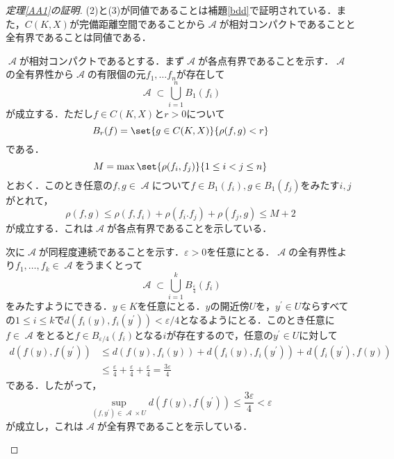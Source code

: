 \documentclass[uplatex]{jsarticle}
\begin{document}
\begin{proof}[定理\ref{AA1}の証明]
    (2)と(3)が同値であることは補題\ref{bdd}で証明されている．また，$C(K,X)$が完備距離空間であることから$\mscrA$が相対コンパクトであることと全有界であることは同値である．

    \begin{subproof}{}
        $\mscrA$が相対コンパクトであるとする．まず$\mscrA$が各点有界であることを示す．$\mscrA$の全有界性から$\mscrA$の有限個の元$f_1,\dots f_n$が存在して
        \[ \mscrA \subset \bigcup_{i=1}^n B_1(f_i) \]
        が成立する．ただし$f\in C(K,X)$と$r > 0$について
        \[ B_r(f) = \set{g\in C(K,X)}{\rho(f,g) < r} \]
        である．
        \[ M = \max \set{\rho(f_i,f_j)}{1\leq i < j \leq n} \]
        とおく．このとき任意の$f,g\in \mscrA$について$f\in B_1(f_i),g\in B_1(f_j)$をみたす$i,j$がとれて，
        \[ \rho(f,g) \leq \rho(f,f_i) + \rho(f_i.f_j) + \rho(f_j,g) \leq M+2 \]
        が成立する．これは$\mscrA$が各点有界であることを示している．

        次に$\mscrA$が同程度連続であることを示す．$\varepsilon>0$を任意にとる．$\mscrA$の全有界性より$f_1,\dots ,f_k\in \mscrA$をうまくとって
        \[ \mscrA \subset \bigcup_{i=1}^k B_{\frac{\varepsilon}{4}} (f_i) \]
        をみたすようにできる．$y\in K$を任意にとる．$y$の開近傍$U$を，$y^\prime\in U$ならすべての$1\leq i \leq k$で$d(f_i(y),f_i(y^\prime))<\varepsilon/4$となるようにとる．このとき任意に$f\in \mscrA$をとると$f\in B_{\varepsilon/4}(f_i)$となる$i$が存在するので，任意の$y^\prime\in U$に対して
        \begin{align*}
            d(f(y),f(y^\prime)) & \leq d(f(y),f_i(y)) + d(f_i(y),f_i(y^\prime)) + d(f_i(y^\prime),f(y))                               \\
                                & \leq \frac{\varepsilon}{4} + \frac{\varepsilon}{4} + \frac{\varepsilon}{4} = \frac{3\varepsilon}{4}
        \end{align*}
        である．したがって，
        \[ \sup_{(f,y^\prime)\in \mscrA\times U} d(f(y),f(y^\prime))\leq \frac{3\varepsilon}{4} < \varepsilon \]
        が成立し，これは$\mscrA$が全有界であることを示している．
    \end{subproof}

    \begin{subproof}{}

    \end{subproof}
\end{proof}

\subsection{}
\end{document}
